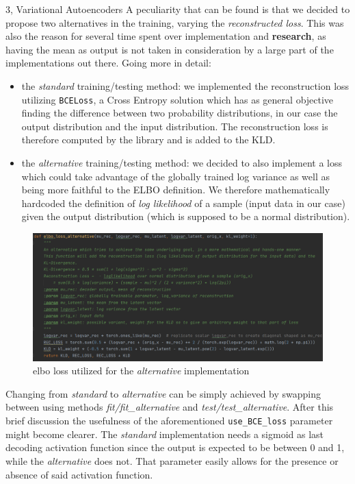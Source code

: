 \documentclass[10pt,a4paper]{article}
\begin{document}
\begin{task}{3, Variational Autoencoders}
A peculiarity that can be found is that we decided to propose two alternatives in the training, varying the \textit{reconstructed loss}. This was also the reason for several time spent over implementation and \textbf{research}, as having the mean as output is not taken in consideration by a large part of the implementations out there. Going more in detail:
\begin{itemize}
    \item the \textit{standard} training/testing method: we implemented the reconstruction loss utilizing \texttt{BCELoss}, a Cross Entropy solution which has as general objective finding the difference between two probability distributions, in our case the output distribution and the input distribution. The reconstruction loss is therefore computed by the library and is added to the KLD.
    \item the \textit{alternative} training/testing method: we decided to also implement a loss which could take advantage of the globally trained log variance as well as being more faithful to the ELBO definition. We therefore mathematically hardcoded the definition of \textit{log likelihood} of  a sample (input data in our case) given the output distribution (which is supposed to be a normal distribution).
\end{itemize}

\begin{figure}[H]
    \centering
    \includegraphics[scale=0.6]{images/elbo_alt.png}
    \caption{elbo loss utilized for the \textit{alternative} implementation}
    \label{fig:alt-elbo}
\end{figure}
Changing from \textit{standard} to \textit{alternative} can be simply achieved by swapping between using methods \textit{fit/fit\_alternative} and \textit{test/test\_alternative}.
After this brief discussion the usefulness of the aforementioned \texttt{use\_BCE\_loss} parameter might become clearer. The \textit{standard} implementation needs a sigmoid as last decoding activation function since the output is expected to be between 0 and 1, while the \textit{alternative} does not. That parameter easily allows for the presence or absence of said activation function. 


\end{task}
\end{document}
